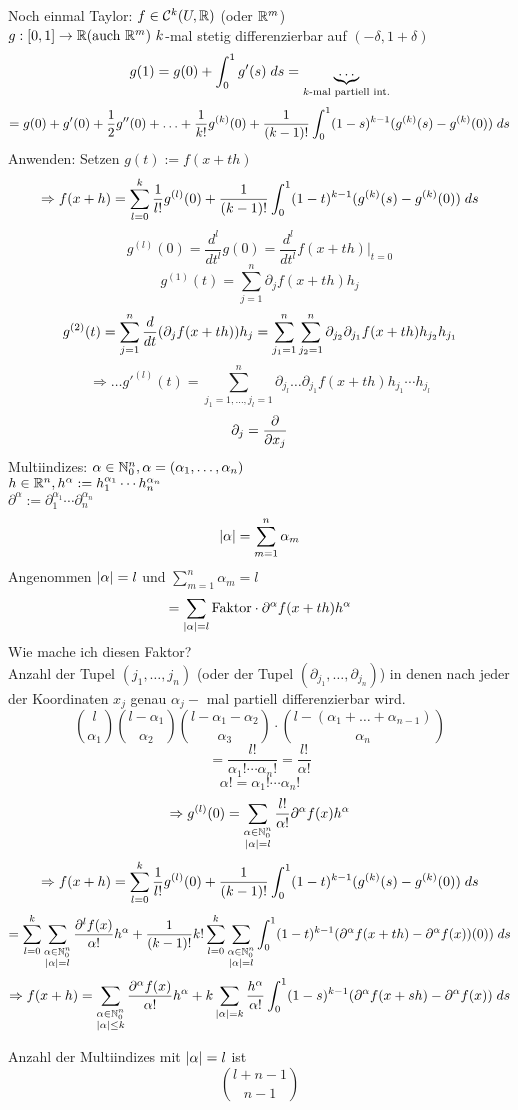 \documentclass[../ana2.tex]{subfiles}
\begin{document}
Noch einmal Taylor: 
\( f \in \mathcal{C}^k(U, \R) \) (oder \( \R^m \)) \\
\(\abb{g}{[0,1]}{\R} (\text{auch }\R^m)\ k\)-mal stetig differenzierbar auf \((-\delta, 1+\delta)\)
\[ g(1) = g(0)+\integralx{g'(s)}{0}{1}{s} = \underbrace{\ldots}_{k\text{-mal partiell int.}} \]
\[ = g(0)+g'(0)+\frac{1}{2}g''(0) + \ldots + \frac{1}{k!} g^{(k)}(0) + \frac{1}{(k-1)!}
\integralx{(1-s)^{k-1} (g^{(k)}(s)-g^{(k)}(0))}{0}{1}{s} \]
Anwenden:
Setzen \( g(t) := f(x + th) \)
\[ \Rightarrow f(x+h) = \sum_{l=0}^k \frac{1}{l!} g^{(l)}(0) 
+ \frac{1}{(k-1)!} \integralx{(1-t)^{k-1} (g^{(k)}(s) - g^{(k)}(0)) }{0}{1}{s} \]
\[ g^{(l)}(0) = \frac{d^l}{dt^l}g(0) = \frac{d^l}{dt^l} f(x+th) \vert_{t=0} \]
\[ g^{(1)}(t) = \sum_{j=1}^n \partial_j f(x+th) h_j \]
\[ g^{(2)}(t) = \sum_{j=1}^n \ddx{t} (\partial_j f(x+th)) h_j 
= \sum_{j_1=1}^n \sum_{j_2 = 1}^n \partial_{j_2} 
\partial_{j_1} f(x + th) h_{j_2} h_{j_1} \]
\[ \Rightarrow \ldots g'^{(l)}(t) = \sum_{j_1=1,\ldots, j_l =1}^n 
\partial_{j_l} \ldots \partial_{j_1} f(x+th) h_{j_1}\cdots h_{j_l} \]
\[ \partial_j = \ddxpartial{x_j} \]
Multiindizes: \(\alpha \in \N_0^n, \alpha = (\alpha_1, \ldots, \alpha_n)\)\\
\( h \in \R^n, h^\alpha := h_1^{\alpha_1} \cdots h_n^{\alpha_n} \)\\
\( \partial^\alpha := \partial_1^{\alpha_1} \cdots \partial_n^{\alpha_n} \)\\
\[ \abs{\alpha} = \sum_{m=1}^n \alpha_m \]
Angenommen \(\abs{\alpha} = l\) und \(\sum_{m=1}^n \alpha_m = l\)
\[ = \sum_{\abs{\alpha} = l} \text{Faktor} \cdot \partial^\alpha f(x+th)h^\alpha \]
Wie mache ich diesen Faktor?\\
Anzahl der Tupel \((j_1, \ldots, j_n)\) (oder der Tupel \((\partial_{j_1}, \ldots, \partial_{j_n})\))
in denen nach jeder der Koordinaten \(x_j\) genau \(\alpha_j-\) mal partiell differenzierbar wird.  
\[ \binom{l}{\alpha_1}\binom{l-\alpha_1}{\alpha_2}\binom{l-\alpha_1-\alpha_2}{\alpha_3}
\cdot \binom{l-(\alpha_1+\ldots+\alpha_{n-1})}{\alpha_n} \]
\[ = \frac{l!}{\alpha_1!\cdots \alpha_n!} = \frac{l!}{\alpha!} \]
\[ \alpha! = \alpha_1!\cdots \alpha_n!  \]
\[ \Rightarrow g^{(l)}(0) = \sum_{\substack{\alpha \in \N_0^n \\ \abs{\alpha} = l}}
\frac{l!}{\alpha!} \partial^\alpha f(x) h^\alpha \]
\[ \Rightarrow f(x+h) = \sum_{l=0}^k \frac{1}{l!} g^{(l)}(0) 
+ \frac{1}{(k-1)!} \integralx{ (1-t)^{k-1} (g^{(k)}(s) - g^{(k)}(0)) }{0}{1}{s} \]
\[ = \sum_{l=0}^k \sum_{\substack{\alpha \in \N_0^n \\ \abs{\alpha} = l}}
\frac{\partial^l f(x)}{\alpha!}h^\alpha + \frac{1}{(k-1)!} k!
\sum_{l=0}^k \sum_{\substack{\alpha \in \N_0^n \\ \abs{\alpha} = l}}
\integralx{(1-t)^{k-1} (\partial^\alpha f(x+th)-\partial^\alpha f(x))(0))}{0}{1}{s} \]
\[ \Rightarrow f(x + h) = \sum_{\substack{\alpha \in \N_0^n \\ \abs{\alpha} \leq k}} 
\frac{ \partial^\alpha f(x) }{\alpha!} h^\alpha 
+ k \sum_{\abs{\alpha} = k} \frac{h^\alpha}{\alpha!} 
\integralx{(1-s)^{k-1} (\partial^\alpha f(x + sh) - \partial^\alpha f(x)) }{0}{1}{s} \]
\begin{bem}
    Anzahl der Multiindizes mit \(\abs{\alpha} = l\) ist 
    \[ \binom{l+n-1}{n-1} \]
\end{bem}
\end{document}
